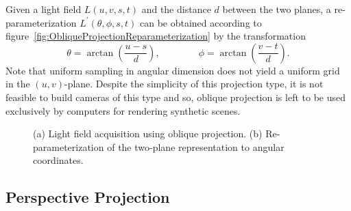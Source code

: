 Given a light field $L(u, v, s, t)$ and the distance $d$ between the two planes, a re-parameterization $L^{\prime}(\theta, \phi, s, t)$ can be obtained according to figure~\ref{fig:ObliqueProjectionReparameterization} by the transformation
\begin{equation}
	\theta = \arctan\left(\frac{u - s}{d}\right), 
	\qquad \qquad
	\phi = \arctan\left(\frac{v - t}{d}\right).
\end{equation}
Note that uniform sampling in angular dimension does not yield a uniform grid in the $(u, v)$-plane.
Despite the simplicity of this projection type, it is not feasible to build cameras of this type and so, oblique projection is left to be used exclusively by computers for rendering synthetic scenes.

\begin{figure}[tb]
	\subcaptionbox{\label{fig:ObliqueProjection}}{}\hfill%
	\subcaptionbox{\label{fig:ObliqueProjectionReparameterization}}{}
	\caption[Parameterization for light fields from oblique projections]
			{(a) Light field acquisition using oblique projection. 
			 (b) Re-parameterization of the two-plane representation to angular coordinates.}
\end{figure}

\subsection*{Perspective Projection}

